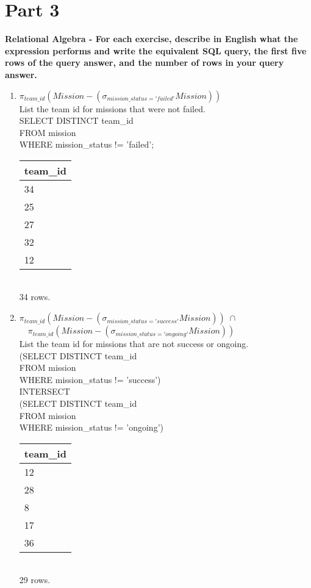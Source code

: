\documentclass{article}
\begin{document}
\section*{Part 3}
\textbf{Relational Algebra - For each exercise, describe in English what the expression performs
and write the equivalent SQL query, the first five rows of the query answer, and the number of
rows in your query answer.}
\begin{enumerate}

\item
$\pi_{team\_id}(Mission - (\sigma_{mission\_status='failed'}Mission))$\\
List the team id for missions that were not failed.\\
SELECT DISTINCT team\_id\\
FROM mission\\
WHERE mission\_status != 'failed';\\
\begin{tabular}{l}
 team\_id \\
\hline
      34\\
      25\\
      27\\
      32\\
      12\\
\end{tabular}
\\34 rows.\\

\item
$\pi_{team\_id}(Mission - (\sigma_{mission\_status='success'}Mission))\; \cap$\\
$\quad\pi_{team\_id}(Mission - (\sigma_{mission\_status='ongoing'}Mission))$\\
List the team id for missions that are not success or ongoing.\\
(SELECT DISTINCT team\_id\\
FROM mission\\
WHERE mission\_status != 'success')\\
INTERSECT\\
(SELECT DISTINCT team\_id\\
FROM mission\\
WHERE mission\_status != 'ongoing')\\
\begin{tabular}{l}
 team\_id \\
\hline
      12\\
      28\\
       8\\
      17\\
      36\\
\end{tabular}
\\29 rows.\\


\end{enumerate}
\end{document}
